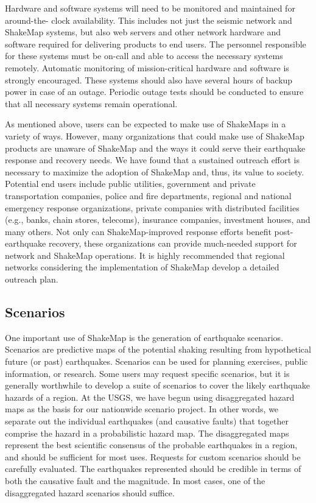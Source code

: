 \documentclass[letterpaper,10pt,english]{sphinxmanual}
\begin{document}
Hardware and software systems will need to be monitored and maintained for around-the-
clock availability. This includes not just the seismic network and ShakeMap systems, but
also web servers and other network hardware and software required for delivering
products to end users. The personnel responsible for these systems must be on-call and
able to access the necessary systems remotely. Automatic monitoring of mission-critical
hardware and software is strongly encouraged. These systems should also have several
hours of backup power in case of an outage. Periodic outage tests should be
conducted to ensure that all necessary systems remain operational.

As mentioned above, users can be expected to make use of ShakeMaps in a variety of
ways. However, many organizations that could make use of ShakeMap products are
unaware of ShakeMap and the ways it could serve their earthquake response and
recovery needs. We have found that a sustained outreach effort is necessary to maximize
the adoption of ShakeMap and, thus, its value to society. Potential end users include
public utilities, government and private transportation companies, police and fire
departments, regional and national emergency response organizations, private companies
with distributed facilities (e.g., banks, chain stores, telecoms), insurance companies,
investment houses, and many others. Not only can ShakeMap-improved response efforts
benefit post-earthquake recovery, these organizations can provide much-needed support
for network and ShakeMap operations. It is highly recommended that regional networks
considering the implementation of ShakeMap develop a detailed outreach plan.


\subsection{Scenarios}
\label{software_guide:scenarios}
One important use of ShakeMap is the generation of earthquake scenarios. Scenarios are
predictive maps of the potential shaking resulting from hypothetical future (or past) earthquakes.
Scenarios can be used for planning exercises, public information, or research. Some
users may request specific scenarios, but it is generally worthwhile to develop a suite of
scenarios to cover the likely earthquake hazards of a region. At the USGS, we have begun
using disaggregated hazard maps as the basis for our nationwide scenario project. In other
words, we separate out the individual earthquakes (and causative faults) that together
comprise the hazard in a probabilistic hazard map. The disaggregated maps represent the
best scientific consensus of the probable earthquakes in a region, and should be sufficient
for most uses. Requests for custom scenarios should be carefully evaluated. The
earthquakes represented should be credible in terms of both the causative fault and the
magnitude. In most cases, one of the disaggregated hazard scenarios should suffice.
\end{document}
